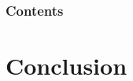 \documentclass[aspectratio=169]{beamer}
\title[\tc]{\deliv{\imp}{Part 2: Presentation}}
\date{\dateimptwo}
\begin{document}

\begin{frame}
\maketitle
\begin{center}
\names
\end{center}
\end{frame}

\begin{frame}
\frametitle{Contents}
\setlength{\columnsep}{0.11in}
\tableofcontents
\end{frame}








\section{Conclusion}

\end{document}
